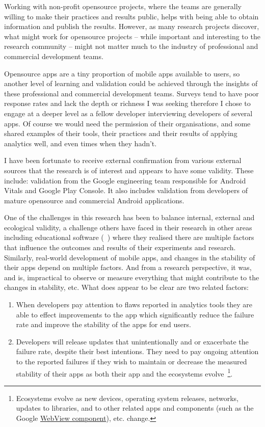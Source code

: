 Working with non-profit opensource projects, where the teams are generally willing to make their practices and results public, helps with being able to obtain information and publish the results. However, as many research projects discover, what might work for opensource projects -- while important and interesting to the research community -- might not matter much to the industry of professional and commercial development teams. 

Opensource apps are a tiny proportion of mobile apps available to users, so another level of learning and validation could be achieved through the insights of these professional and commercial development teams. Surveys tend to have poor response rates and lack the depth or richness I was seeking therefore I chose to engage at a deeper level as a fellow developer interviewing developers of several apps. Of course we would need the permission of their organisations, and some shared examples of their tools, their practices and their results of applying analytics well, and even times when they hadn't.

I have been fortunate to receive external confirmation from various external sources that the research is of interest and appears to have some validity. These include: validation from the Google engineering team responsible for Android Vitals and Google Play Console. It also includes validation from developers of mature opensource and commercial Android applications. 

One of the challenges in this research has been to balance internal, external and ecological validity, a challenge others have faced in their research in other areas including educational software (~\cite{ransdell1993educational_software_evaluation_research_validities}) where they realised there are multiple factors that influence the outcomes and results of their experiments and research. Similarly, real-world development of mobile apps, and changes in the stability of their apps depend on multiple factors. And from a research perspective, it was, and is, impractical to observe or measure everything that might contribute to the changes in stability, etc. What does appear to be clear are two related factors:

\begin{enumerate}
    \item When developers pay attention to flaws reported in analytics tools they are able to effect improvements to the app which significantly reduce the failure rate and improve the stability of the apps for end users.
    \item Developers will release updates that unintentionally and or exacerbate the failure rate, despite their best intentions. They need to pay ongoing attention to the reported failures if they wish to maintain or decrease the measured stability of their apps as both their app and the ecosystems evolve~\footnote{Ecosystems evolve as new devices, operating system releases, networks, updates to libraries, and to other related apps and components (such as the Google \href{ection-webview-component}{WebView component}), etc. change.}.
\end{enumerate}

